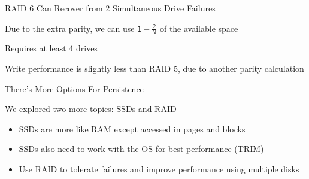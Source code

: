   \begin{frame}{RAID 6 Can Recover from 2 Simultaneous Drive Failures}

    Due to the extra parity, we can use $\mathsf{1 - \frac{2}{N}}$ of the available space

    \hspace{2em} Requires at least 4 drives

    \vspace{2em}

    Write performance is slightly less than RAID 5, due to another parity calculation
  \end{frame}

  \begin{frame}{There's More Options For Persistence}

    We explored two more topics: SSDs and RAID
    \begin{itemize}
      \item SSDs are more like RAM except accessed in pages and blocks
      \item SSDs also need to work with the OS for best performance (TRIM)
      \item Use RAID to tolerate failures and improve performance using multiple disks
    \end{itemize}
  \end{frame}


